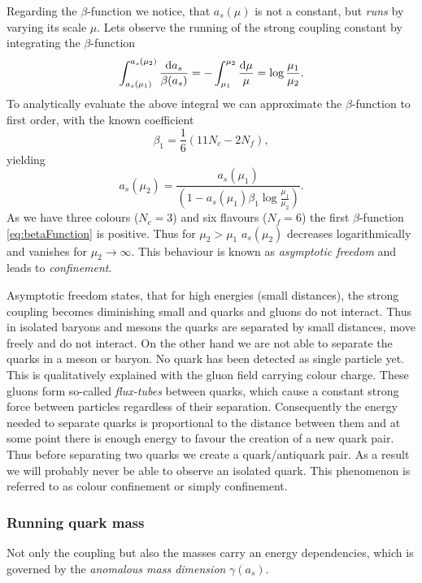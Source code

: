 \documentclass[../../index.tex]{subfiles}
\begin{document}
Regarding the $\beta$-function we notice, that $a_s(\mu)$ is not a constant, but
\textit{runs} by varying its scale $\mu$. Lets observe the running of the strong
coupling constant by integrating the $\beta$-function
\begin{equation}
  \int_{a_s(\mu_1)}^{a_s(\mu_2)}\frac{\dif a_s}{\beta(a_s)} = - \int_{\mu_1}^{\mu_2} \frac{\dif \mu}{\mu} = \log \frac{\mu_1}{\mu_2}.
\end{equation}
To analytically evaluate the above integral we can approximate the
$\beta$-function to first order, with the known coefficient
\begin{equation}
  \label{eq:firstBetaCoefficient}
  \beta_1 = \frac{1}{6}(11 N_c - 2 N_f),
\end{equation}
yielding
\begin{equation}
  a_s(\mu_2) = \frac{a_s(\mu_1)}{\left( 1 - a_s(\mu_1) \beta_1 \log\frac{\mu_1}{\mu_2} \right)}.
\end{equation}
As we have three colours ($N_c=3$) and six flavours ($N_f=6$) the first
$\beta$-function \ref{eq:betaFunction} is positive. Thus for $\mu_2>\mu_1$
$a_s(\mu_2)$ decreases logarithmically and vanishes for $\mu_2 \to \infty$. This
behaviour is known as \textit{asymptotic freedom} and leads to
\textit{confinement}.

Asymptotic freedom states, that for high energies (small distances), the strong
coupling becomes diminishing small and quarks and gluons do not interact. Thus
in isolated baryons and mesons the quarks are separated by small distances, move
freely and do not interact. On the other hand we are not able to separate the
quarks in a meson or baryon. No quark has been detected as single particle yet.
This is qualitatively explained with the gluon field carrying colour charge.
These gluons form so-called \textit{flux-tubes} between quarks, which cause a
constant strong force between particles regardless of their separation.
Consequently the energy needed to separate quarks is proportional to the
distance between them and at some point there is enough energy to favour the
creation of a new quark pair. Thus before separating two quarks we create a
quark\-/antiquark pair. As a result we will probably never be able to observe an
isolated quark. This phenomenon is referred to as colour confinement or simply
confinement.

\subsubsection{Running quark mass}
Not only the coupling but also the masses carry an energy dependencies, which is
governed by the \textit{anomalous mass dimension} $\gamma(a_s)$.
\end{document}

